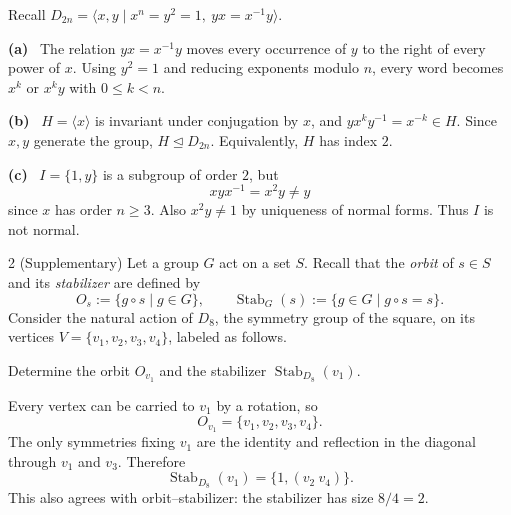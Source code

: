 \documentclass[11pt]{article}
\newcommand{\partlabel}[1]{\par\textbf{(#1)}\ }
\newcommand{\Stab}{\operatorname{Stab}}
\begin{document}
\begin{solution}
Recall $D_{2n}=\langle x,y\mid x^n=y^2=1,\ yx=x^{-1}y\rangle$.
\partlabel{a} The relation $yx=x^{-1}y$ moves every occurrence of $y$ to the right of every power of $x$. Using $y^2=1$ and reducing exponents modulo $n$, every word becomes $x^k$ or $x^ky$ with $0\leq k<n$. 
\partlabel{b} $H=\langle x\rangle$ is invariant under conjugation by $x$, and $yx^ky^{-1}=x^{-k}\in H$. Since $x,y$ generate the group, $H\trianglelefteq D_{2n}$. Equivalently, $H$ has index $2$.
\partlabel{c} $I=\{1,y\}$ is a subgroup of order $2$, but
\[
 xyx^{-1}=x^2y\ne y
\]
since $x$ has order $n\geq3$. Also $x^2y\ne1$ by uniqueness of normal forms. Thus $I$ is not normal.
\end{solution}

\begin{exercise}{2 (Supplementary)}
Let a group $G$ act on a set $S$. Recall that the \emph{orbit} of
$s\in S$ and its \emph{stabilizer} are defined by
\[
  O_s:=\{g\circ s\mid g\in G\},
  \qquad
  \operatorname{Stab}_G(s):=\{g\in G\mid g\circ s=s\}.
\]
Consider the natural action of $D_8$, the symmetry group of the square,
on its vertices $V=\{v_1,v_2,v_3,v_4\}$, labeled as follows.
\begin{center}
\end{center}
Determine the orbit $O_{v_1}$ and the stabilizer
$\operatorname{Stab}_{D_8}(v_1)$.
\end{exercise}

\begin{solution}
Every vertex can be carried to $v_1$ by a rotation, so
\[
 O_{v_1}=\{v_1,v_2,v_3,v_4\}.
\]
The only symmetries fixing $v_1$ are the identity and reflection in the diagonal through $v_1$ and $v_3$. Therefore
\[
 \boxed{\Stab_{D_8}(v_1)=\{1,(v_2\ v_4)\}.}
\]
This also agrees with orbit--stabilizer: the stabilizer has size $8/4=2$.
\end{solution}
\end{document}
